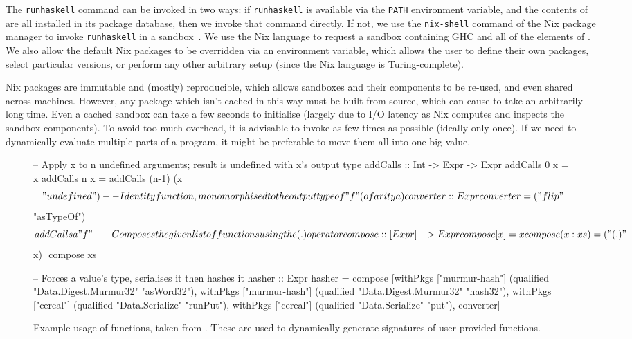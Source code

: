 The \texttt{runhaskell} command can be invoked in two ways: if
\texttt{runhaskell} is available via the \texttt{PATH} environment variable, and
the contents of  are all installed in its package database, then we
invoke that command directly. If not, we use the \texttt{nix-shell} command of
the Nix package manager to invoke \texttt{runhaskell} in a
sandbox~\cite{dolstra2004nix}. We use the Nix language to request a sandbox
containing GHC and all of the elements of . We also allow the default
Nix packages to be overridden via an environment variable, which allows the user
to define their own packages, select particular versions, or perform any other
arbitrary setup (since the Nix language is Turing-complete).

Nix packages are immutable and (mostly) reproducible, which allows sandboxes and
their components to be re-used, and even shared across machines. However, any
package which isn't cached in this way must be built from source, which can
cause  to take an arbitrarily long time. Even a cached sandbox can take
a few seconds to initialise (largely due to I/O latency as Nix computes and
inspects the sandbox components). To avoid too much overhead, it is advisable to
invoke  as few times as possible (ideally only once). If we need to
dynamically evaluate multiple parts of a program, it might be preferable to move
them all into one big  value.

\begin{figure}
  \begin{haskell}
-- Apply x to n undefined arguments; result is undefined with x's output type
addCalls :: Int -> Expr -> Expr
addCalls 0 x = x
addCalls n x = addCalls (n-1) (x $$ "undefined")

-- Identity function, monomorphised to the output type of "f" (of arity a)
converter :: Expr
converter = ("flip" $$ "asTypeOf") $$ addCalls a "f"

-- Composes the given list of functions using the (.) operator
compose :: [Expr] -> Expr
compose [x]    = x
compose (x:xs) = ("(.)" $$ x) $$ compose xs

-- Forces a value's type, serialises it then hashes it
hasher :: Expr
hasher = compose [withPkgs ["murmur-hash"]
                    (qualified "Data.Digest.Murmur32" "asWord32"),
                  withPkgs ["murmur-hash"]
                    (qualified "Data.Digest.Murmur32" "hash32"),
                  withPkgs ["cereal"]
                    (qualified "Data.Serialize" "runPut"),
                  withPkgs ["cereal"]
                    (qualified "Data.Serialize" "put"),
                  converter]
  \end{haskell}
  \caption{Example usage of \nixeval{} functions, taken from \mlforhs{}.
    These are used to dynamically generate \quickspec{} signatures of
    user-provided functions.}
  \label{fig:nix-eval}
\end{figure}

